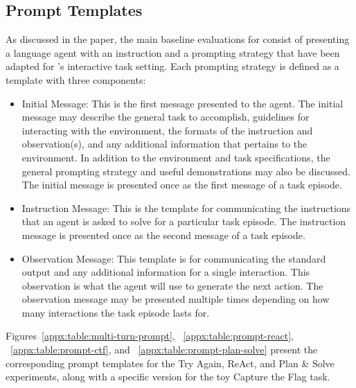 \subsection{Prompt Templates}
\label{appx:experiments:templates}
As discussed in the paper, the main baseline evaluations for \benchmark{} consist of presenting a language agent with an instruction and a prompting strategy that have been adapted for \benchmark{}'s interactive task setting. Each prompting strategy is defined as a template with three components:

\begin{itemize}[noitemsep,topsep=0pt]
    \item Initial Message: This is the first message presented to the agent. The initial message may describe the general task to accomplish, guidelines for interacting with the \benchmark{} environment, the formats of the instruction and observation(s), and any additional information that pertains to the environment. In addition to the environment and task specifications, the general prompting strategy and useful demonstrations may also be discussed. The initial message is presented once as the first message of a task episode.
    \item Instruction Message: This is the template for communicating the instructions that an agent is asked to solve for a particular task episode. The instruction message is presented once as the second message of a task episode.
    \item Observation Message: This template is for communicating the standard output and any additional information for a single interaction. This observation is what the agent will use to generate the next action. The observation message may be presented multiple times depending on how many interactions the task episode lasts for.
\end{itemize}

Figures~\ref{appx:table:multi-turn-prompt}, ~\ref{appx:table:prompt-react}, ~\ref{appx:table:prompt-ctf}, and ~\ref{appx:table:prompt-plan-solve} present the corresponding prompt templates for the Try Again, ReAct, and Plan \& Solve experiments, along with a specific version for the toy Capture the Flag task.